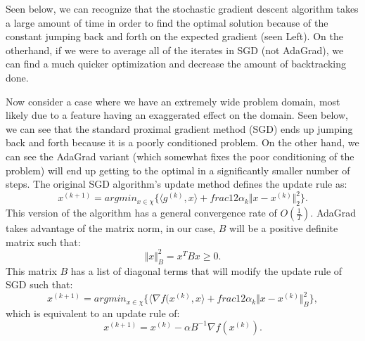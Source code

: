 Seen below, we can recognize that the stochastic gradient descent algorithm takes a large
amount of time in order to find the optimal solution because of the constant jumping back and
forth on the expected gradient (seen Left). 
On the otherhand, if we were to average all of the iterates in SGD (not AdaGrad), 
we can find a much quicker optimization and decrease the amount of backtracking done.

Now consider a case where we have an extremely wide problem domain, most likely due to a
feature having an exaggerated effect on the domain.
Seen below, we can see that the standard proximal gradient method (SGD) ends up jumping back and 
forth because it is a poorly conditioned problem.
On the other hand, we can see the AdaGrad variant (which somewhat fixes the poor conditioning of 
the problem) will end up getting to the optimal in a significantly smaller number of steps.
The original SGD algorithm’s update method defines the update rule as:
\begin{equation}
	\label{equ:SGD_equ}
	x^{(k+1)} = argmin_{x\in \chi}\{\langle g^{(k)},x\rangle + frac{1}{2\alpha_{k}}
	\Vert x-x^{(k)}\Vert_{2}^{2}\}.
\end{equation}
This version of the algorithm has a general convergence rate of $O(\frac{1}{T})$.
AdaGrad takes advantage of the matrix norm, in our case, $B$ will be a positive
definite matrix such that:
\begin{equation}
	\label{equ:definite_matrix}
	\Vert  x \Vert_{B}^{2} = x^{T}Bx \geq 0.
\end{equation}
This matrix $B$ has a list of diagonal terms that will modify the update rule of SGD such that:
\begin{equation}
	\label{equ:modified_SGD}
	x^{(k+1)} = argmin_{x\in \chi}\{\langle \nabla f(x^{(k)} ,x\rangle + frac{1}{2\alpha_{k}}
	\Vert x-x^{(k)}\Vert_{B}^{2}\},
\end{equation}
which is equivalent to an update rule of:
\begin{equation}
	\label{equ:mod_sgd_equ}
	x^{(k+1)} = x^{(k)} - \alpha B^{-1} \nabla f(x^{(k)}).
\end{equation}

